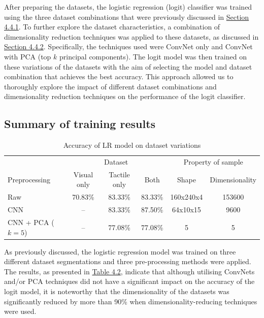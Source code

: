 \documentclass[11pt, a4paper]{report}
\begin{document}
After preparing the datasets, the logistic regression (logit) classifier was trained using the three dataset combinations that were previously discussed in \hyperref[sec:4.4.1]{Section 4.4.1}. To further explore the dataset characteristics, a combination of dimensionality reduction techniques was applied to these datasets, as discussed in \hyperref[sec:4.4.2]{Section 4.4.2}. Specifically, the techniques used were ConvNet only and ConvNet with PCA (top $k$ principal components). The logit model was then trained on these variations of the datasets with the aim of selecting the model and dataset combination that achieves the best accuracy. This approach allowed us to thoroughly explore the impact of different dataset combinations and dimensionality reduction techniques on the performance of the logit classifier.


\subsection{Summary of training results}
\label{sec:4.5.1}
\begin{table}[H]
    \centering
    \small
    \begin{tabular}{lccccc}
        \toprule
        & \multicolumn{3}{c}{Dataset} & \multicolumn{2}{c}{Property of sample} \\
        \cmidrule{2-4}\cmidrule{5-6}
        Preprocessing & Visual only & Tactile only & Both & Shape & Dimensionality \\
        \midrule
        Raw & 70.83\% & 83.33\% & 83.33\% & 160x240x4 & 153600 \\
        CNN & -- & 83.33\% & 87.50\% & 64x10x15  & 9600 \\
        CNN + PCA ($k=5$) & -- & 77.08\% & 77.08\% & 5 & 5\\
        \bottomrule
    \end{tabular}
    \caption{Accuracy of LR model on dataset variations}
    \label{tbl:4.2}
\end{table}
As previously discussed, the logistic regression model was trained on three different dataset segmentations and three pre-processing methods were applied. The results, as presented in \hyperref[tbl:4.2]{Table 4.2}, indicate that although utilising ConvNets and/or PCA techniques did not have a significant impact on the accuracy of the logit model, it is noteworthy that the dimensionality of the datasets was significantly reduced by more than 90\% when dimensionality-reducing techniques were used.\\
\end{document}
